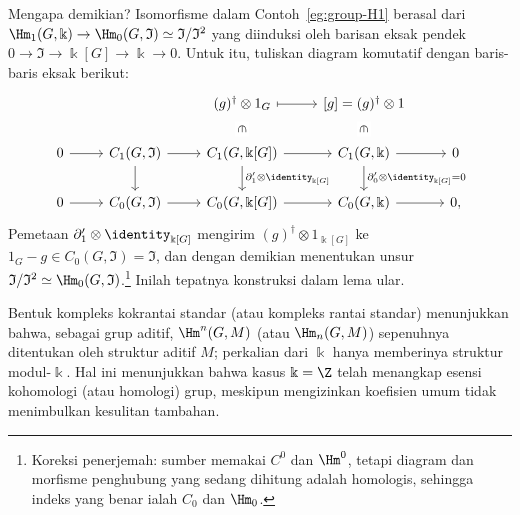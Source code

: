 \begin{contoh}
	Mengapa demikian? Isomorfisme dalam Contoh~\ref{eg:group-H1} berasal dari
	$\Hm_1(G,\Bbbk)\to\Hm_0(G,\mathfrak{I})\simeq
	\mathfrak{I}/\mathfrak{I}^2$ yang diinduksi oleh barisan eksak pendek
	$0\to\mathfrak{I}\to\Bbbk[G]\to\Bbbk\to0$. Untuk itu, tuliskan diagram
	komutatif dengan baris-baris eksak berikut:
	\[\begin{tikzcd}
		& & {(g)^\dagger \otimes 1_G} \arrow[phantom, d, "\in" description, sloped] \arrow[mapsto, r] & {[g] = (g)^\dagger \otimes 1} \arrow[phantom, d, "\in" description, sloped] & \\
		0 \arrow[r] & C_1(G, \mathfrak{I}) \arrow[r] \arrow[d] & C_1(G, \Bbbk[G]) \arrow[r] \arrow[d, "{\partial'_1 \otimes \identity_{\Bbbk[G]}}"] & C_1(G, \Bbbk) \arrow[r] \arrow[d, "{\partial'_0 \otimes \identity_{\Bbbk[G]} = 0}"] & 0 \\
		0 \arrow[r] & C_0(G, \mathfrak{I}) \arrow[r] & C_0(G, \Bbbk[G]) \arrow[r] & C_0(G, \Bbbk) \arrow[r] & 0 ,
	\end{tikzcd}\]
	Pemetaan $\partial'_1\otimes\identity_{\Bbbk[G]}$ mengirim
	$(g)^\dagger\otimes1_{\Bbbk[G]}$ ke
	$1_G-g\in C_0(G,\mathfrak{I})=\mathfrak{I}$, dan dengan demikian
	menentukan unsur $\mathfrak{I}/\mathfrak{I}^2\simeq
	\Hm_0(G,\mathfrak{I})$.\footnote{Koreksi penerjemah: sumber memakai
	$C^0$ dan $\Hm^0$, tetapi diagram dan morfisme penghubung yang sedang
	dihitung adalah homologis, sehingga indeks yang benar ialah $C_0$ dan
	$\Hm_0$.} Inilah tepatnya konstruksi dalam lema ular.
\end{contoh}

\begin{catatan}\label{rem:Gmod-k}
	Bentuk kompleks kokrantai standar (atau kompleks rantai standar)
	menunjukkan bahwa, sebagai grup aditif, $\Hm^n(G,M)$ (atau
	$\Hm_n(G,M)$) sepenuhnya ditentukan oleh struktur aditif $M$; perkalian
	dari $\Bbbk$ hanya memberinya struktur modul-$\Bbbk$. Hal ini menunjukkan
	bahwa kasus $\Bbbk=\Z$ telah menangkap esensi kohomologi (atau homologi)
	grup, meskipun mengizinkan koefisien umum tidak menimbulkan kesulitan
	tambahan.
\end{catatan}

